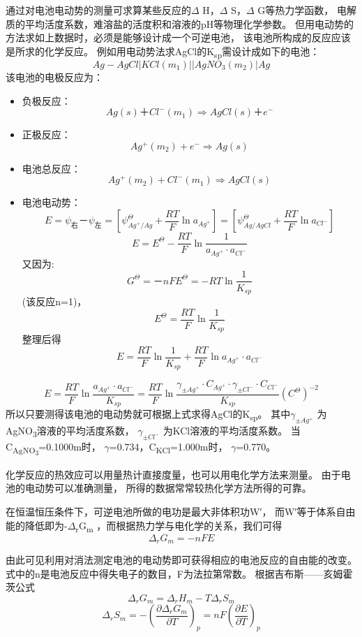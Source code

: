 \documentclass[11pt]{report}
\begin{document}
通过对电池电动势的测量可求算某些反应的\(\Delta\) H，\(\Delta\) S，\(\Delta\) G等热力学函数，
电解质的平均活度系数，难溶盐的活度积和溶液的pH等物理化学参数。
但用电动势的方法求如上数据时，必须是能够设计成一个可逆电池，
该电池所构成的反应应该是所求的化学反应。
例如用电动势法求AgCl的K\textsubscript{sp}需设计成如下的电池：
\[
   Ag-AgCl|KCl(m_{1})||AgNO_{3}(m_{2})|Ag
   \]
该电池的电极反应为：
\begin{itemize}
\item 负极反应：
\[
     Ag(s)＋Cl^{-}(m_{1})\Longrightarrow AgCl(s)＋e^{-}
     \]
\item 正极反应：
\[
     Ag^{+}(m_{2})+e^{-}\Longrightarrow Ag(s)
     \]
\item 电池总反应：
\[
     Ag^{+}(m_{2})+Cl^{-}(m_{1})\Longrightarrow AgCl(s)
     \]
\item 电池电动势：
\[
     E=\psi_{右}－\psi_{左}
     =[\psi^{\Theta}_{Ag^{+}/Ag}+\frac{RT}{F}\ln a_{Ag^{+}}]
     =[\psi^{\Theta}_{Ag/AgCl}+\frac{RT}{F}\ln a_{Cl^{-}}]
     \]
\[
     E=E^{\Theta}-\frac{RT}{F}\ln \frac{1}{a_{Ag^{+}}\cdot a_{Cl^{-}}}
     \]
又因为:
\[
     G^{\Theta}=－nFE^{\Theta}=-RT\ln\frac{1}{K_{sp}}
     \]
(该反应n=1)，
\[
     E^{\Theta}=\frac{RT}{F}\ln\frac{1}{K_{sp}}
     \]
整理后得
\[
     E=
     \frac{RT}{F}\ln\frac{1}{K_{sp}}+\frac{RT}{F}\ln a_{Ag^{+}}\cdot a_{Cl^{-}}
     \]
\end{itemize}
\[
   E=\frac{RT}{F}\ln\frac{a_{Ag^{+}}\cdot a_{Cl^{-}}}{K_{sp}}
   =\frac{RT}{F}\ln\frac{\gamma_{\pm Ag^{+}}\cdot C_{Ag^{+}}\cdot\gamma_{\pm Cl^{-}}\cdot C_{Cl^{-}}}{K_{sp}} (C^{\Theta})^{-2}
   \]
所以只要测得该电池的电动势就可根据上式求得AgCl的K\textsubscript{sp}。
其中\(\gamma_{\pm Ag^{+}}\) 为AgNO\textsubscript{3}溶液的平均活度系数，
\(\gamma_{\pm Cl^{-}}\) 为KCl溶液的平均活度系数。
当C\textsubscript{AgNO\textsubscript{3}}=0.1000m时，
\(\gamma\)\textsubscript{\textpm{}}=0.734，C\textsubscript{KCl}=1.000m时，
\(\gamma\)\textsubscript{\textpm{}}=0.770。

化学反应的热效应可以用量热计直接度量，也可以用电化学方法来测量。
由于电池的电动势可以准确测量，
所得的数据常常较热化学方法所得的可靠。

在恒温恒压条件下，可逆电池所做的电功是最大非体积功W′，
而W′等于体系自由能的降低即为-\(\Delta\)\textsubscript{r}G\textsubscript{m}
，而根据热力学与电化学的关系，我们可得
\[
   \Delta_{r}G_{m} =-nFE
   \]

由此可见利用对消法测定电池的电动势即可获得相应的电池反应的自由能的改变。
式中的n是电池反应中得失电子的数目，F为法拉第常数。
根据吉布斯——亥姆霍茨公式
\[
   \Delta_{r}G_{m}=\Delta_{r}H_{m}-T\Delta_{r}S_{m}
   \]
\[
   \Delta_{r}S_{m}=-\left(\frac{\partial \Delta_{r}G_{m}}{\partial T}\right)_{p}=nF\left(\frac{\partial E}{\partial T}\right)_{p}
   \]
\end{document}
